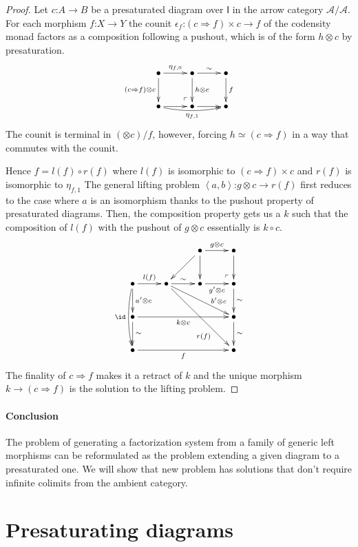 \documentclass{tac}
\makeatletter
\newcommand\cat\mathcal
\newcommand\icat\mathsf
\newcommand\of{\mathord:}
\newcommand\tuplet[1]{\left\langle #1 \right\rangle}
\newcommand\pushed{\ar@{}[ul]|(.2)\ulcorner}
\makeatother
\begin{document}
\begin{proof}
Let $c\of A\to B$ be a presaturated diagram over $\icat I$ in the arrow category $\cat A/\cat A$. 
For each morphism $f\of X\to Y$ the counit $\epsilon_f\of(c\Rightarrow f)\times c\to f$ of the codensity monad factors as a composition following a pushout, which is of the form $h\otimes c$ by presaturation.
\[\xymatrix{
\bullet\ar[d]_{(c\Rightarrow f)\otimes c} \ar[r]^{\eta_{f,0}} & \bullet \ar[d]^{h\otimes c} \ar[r]^\sim & \bullet\ar[d]^f\\
\bullet \ar[r]\ar@/_1ex/[rr]_{\eta_{f,1}} & \bullet\pushed\ar[r] & \bullet
}\]
The counit is terminal in $(\otimes c)/f$, however, forcing $h \simeq (c\Rightarrow f)$ in a way that commutes with the counit.

Hence $f = l(f)\circ r(f)$ where $l(f)$ is isomorphic to $(c\Rightarrow f)\times c$ and $r(f)$ is isomorphic to $\eta_{f,1}$
The general lifting problem $\tuplet{a,b}\of g\otimes c\to r(f)$ first reduces to the case where $a$ is an isomorphism thanks to the pushout property of presaturated diagrams. Then, the composition property gets us a $k$ such that the composition of $l(f)$ with the pushout of $g\otimes c$ essentially is $k\circ c$.
\[\xymatrix{
&& \bullet\ar[r]^{g\otimes c}\ar[d]\ar[dl] & 
\bullet\ar[d]\\ 
\bullet\ar@/_1ex/[dd]_\id\ar[d]^{a'\otimes c}\ar[r]^{l(f)} & 
\bullet\ar[r]^\sim\ar[drr]^(.7){b'\otimes c}\ar[ddrr]_(.7){r(f)} & 
\bullet\ar[r]_{g'\otimes c} & 
\bullet\pushed\ar[d]^\sim\\
\bullet\ar[d]^\sim\ar[rrr]_{k\otimes c} &&& \bullet\ar[d]^\sim \\
\bullet\ar[rrr]_f &&& \bullet 
}\]
The finality of $c\Rightarrow f$ makes it a retract of $k$ and the unique morphism $k\to (c\Rightarrow f)$ is the solution to the lifting problem.
\end{proof}

\paragraph{Conclusion}
The problem of generating a factorization system from a family of generic left morphisms can be reformulated as the problem extending a given diagram to a presaturated one. We will show that new problem has solutions that don't require infinite colimits from the ambient category.

\section{Presaturating diagrams}
\end{document}
